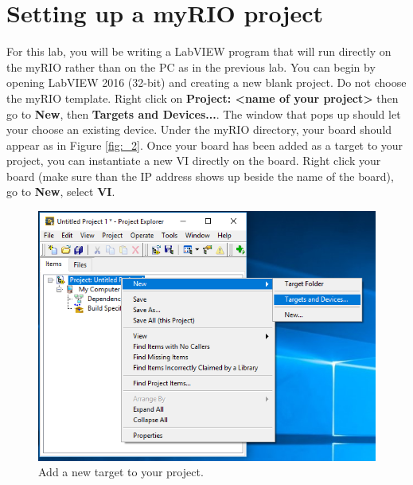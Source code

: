 \documentclass{article}
\begin{document}
\section{Setting up a myRIO project}
For this lab, you will be writing a LabVIEW program that will run directly on the myRIO rather than on the PC as in the previous lab. You can begin by opening LabVIEW 2016 (32-bit) and creating a new blank project. Do not choose the myRIO template. Right click on \textbf{Project: \textless name of your project\textgreater} then go to \textbf{New}, then \textbf{Targets and Devices...}. The window that pops up should let your choose an existing device. Under the myRIO directory, your board should appear as in Figure \ref{fig:_2}. Once your board has been added as a target to your project, you can instantiate a new VI directly on the board. Right click your board (make sure than the IP address shows up beside the name of the board), go to \textbf{New}, select \textbf{VI}.

\begin{figure}[h!]
\hspace{25mm} 
\includegraphics[scale=0.7]{figs/_1.png}
\caption{Add a new target to your project.}
\label{fig:_1}
\end{figure}
\end{document}
